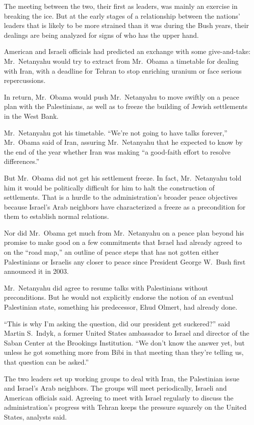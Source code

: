 \documentclass[12pt,a4paper,onecolumn]{article}
\begin{document}
The meeting between the two, their first as leaders, was mainly an exercise in breaking the ice. But
at the early stages of a relationship between the nations' leaders that is likely to be more
strained than it was during the Bush years, their dealings are being analyzed for signs of who has
the upper hand.

American and Israeli officials had predicted an exchange with some give-and-take: Mr.~Netanyahu
would try to extract from Mr.~Obama a timetable for dealing with Iran, with a deadline for Tehran to
stop enriching uranium or face serious repercussions.

In return, Mr.~Obama would push Mr.~Netanyahu to move swiftly on a peace plan with the Palestinians,
as well as to freeze the building of Jewish settlements in the West Bank.

Mr.~Netanyahu got his timetable. ``We're not going to have talks forever,'' Mr.~Obama said of Iran,
assuring Mr.~Netanyahu that he expected to know by the end of the year whether Iran was making ``a
good-faith effort to resolve differences.''

But Mr.~Obama did not get his settlement freeze. In fact, Mr.~Netanyahu told him it would be
politically difficult for him to halt the construction of settlements. That is a hurdle to the
administration's broader peace objectives because Israel's Arab neighbors have characterized a
freeze as a precondition for them to establish normal relations.

Nor did Mr.~Obama get much from Mr.~Netanyahu on a peace plan beyond his promise to make good on a
few commitments that Israel had already agreed to on the ``road map,'' an outline of peace steps
that has not gotten either Palestinians or Israelis any closer to peace since President George
W.~Bush first announced it in 2003.

Mr.~Netanyahu did agree to resume talks with Palestinians without preconditions. But he would not
explicitly endorse the notion of an eventual Palestinian state, something his predecessor, Ehud
Olmert, had already done.

``This is why I'm asking the question, did our president get suckered?'' said Martin S.~Indyk, a
former United States ambassador to Israel and director of the Saban Center at the Brookings
Institution. ``We don't know the answer yet, but unless he got something more from Bibi in that
meeting than they're telling us, that question can be asked.''

The two leaders set up working groups to deal with Iran, the Palestinian issue and Israel's Arab
neighbors. The groups will meet periodically, Israeli and American officials said. Agreeing to meet
with Israel regularly to discuss the administration's progress with Tehran keeps the pressure
squarely on the United States, analysts said.
\end{document}
